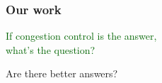 \documentclass[svgnames]{beamer}
\begin{document}
\begin{frame}
{}
\end{frame}

%

\begin{frame}

\frametitle{Our work}

\begin{centering}

\LARGE \textcolor{DarkGreen}{If congestion control is the answer,\\what's the question?}

\vspace{\baselineskip}

\pause

\LARGE \textcolor{NavyBlue}{Are there better answers?}

\end{centering}

\end{frame}
\end{document}
